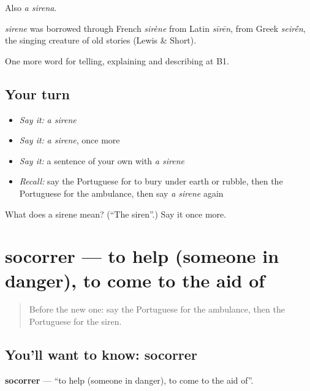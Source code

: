 Also \emph{a sirena}.

\begin{cousinweb}
\emph{sirene} was borrowed through French \emph{sirène} from Latin \emph{sīrēn}, from Greek \emph{seir\'{\={e}}n}, the singing creature of old stories (Lewis \& Short).
\end{cousinweb}

\begin{grammarlens}[title={What you've built}]
One more word for telling, explaining and describing at B1.
\end{grammarlens}

\subsection*{Your turn}
\begin{itemize}
\raggedright
  \item \emph{Say it:} \emph{a sirene}
  \item \emph{Say it:} \emph{a sirene}, once more
  \item \emph{Say it:} a sentence of your own with \emph{a sirene}
  \item \emph{Recall:} say the Portuguese for to bury under earth or rubble, then the Portuguese for the ambulance, then say \emph{a sirene} again
\end{itemize}

\begin{tcolorbox}[breakable,colback=teal!4,colframe=teal!35!black,title={Before you move on}]
What does a sirene mean? (\textquotedblleft{}The siren\textquotedblright{}.) Say it once more.
\end{tcolorbox}
\section[socorrer]{socorrer — to help (someone in danger), to come to the aid of}

\label{lesson:PT-C305-socorrer}



\begin{quote}
Before the new one: say the Portuguese for the ambulance, then the Portuguese for the siren.
\end{quote}

\subsection*{You'll want to know: socorrer}
\textbf{socorrer} — \textquotedblleft{}to help (someone in danger), to come to the aid of\textquotedblright{}.

